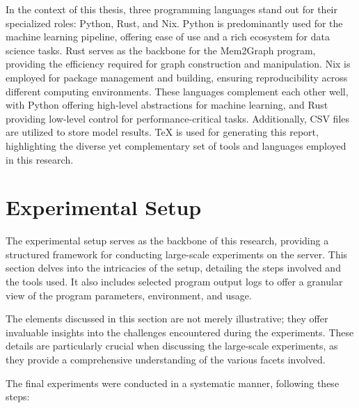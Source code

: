 In the context of this thesis, three programming languages stand out for their specialized roles: Python, Rust, and Nix. Python is predominantly used for the machine learning pipeline, offering ease of use and a rich ecosystem for data science tasks. Rust serves as the backbone for the Mem2Graph program, providing the efficiency required for graph construction and manipulation. Nix is employed for package management and building, ensuring reproducibility across different computing environments. These languages complement each other well, with Python offering high-level abstractions for machine learning, and Rust providing low-level control for performance-critical tasks. Additionally, CSV files are utilized to store model results. TeX is used for generating this report, highlighting the diverse yet complementary set of tools and languages employed in this research. 

\section{Experimental Setup}

The experimental setup serves as the backbone of this research, providing a structured framework for conducting large-scale experiments on the server. This section delves into the intricacies of the setup, detailing the steps involved and the tools used. It also includes selected program output logs to offer a granular view of the program parameters, environment, and usage.

The elements discussed in this section are not merely illustrative; they offer invaluable insights into the challenges encountered during the experiments. These details are particularly crucial when discussing the large-scale experiments, as they provide a comprehensive understanding of the various facets involved.

The final experiments were conducted in a systematic manner, following these steps:

